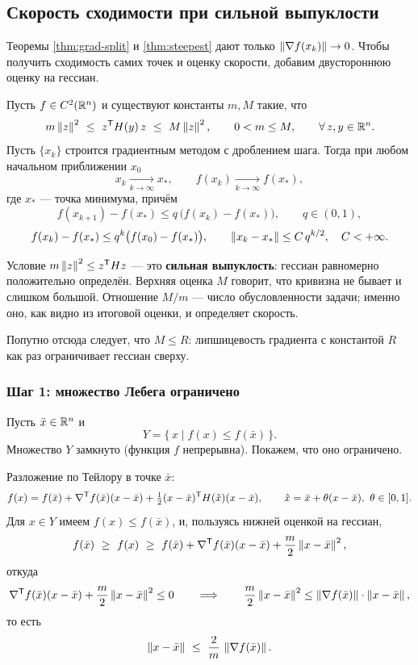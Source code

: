 \subsection{Скорость сходимости при сильной выпуклости}

Теоремы \ref{thm:grad-split} и \ref{thm:steepest} дают только
$\left\lVert \nabla f(x_k) \right\rVert \to 0$. Чтобы получить сходимость самих точек и оценку
скорости, добавим двустороннюю оценку на гессиан.

\begin{theorem}\label{thm:grad-rate}
Пусть $f \in C^2(\mathbb{R}^n)$ и существуют константы $m, M$ такие, что
\[
  m\left\lVert z \right\rVert^2 \ \le\ z^{\mathsf{T}} H(y)\, z \ \le\ M\left\lVert z \right\rVert^2 ,
  \qquad 0 < m \le M, \qquad \forall\, z, y \in \mathbb{R}^n .
\]
Пусть $\{x_k\}$ строится градиентным методом с дроблением шага. Тогда при
любом начальном приближении $x_0$
\[
  x_k \xrightarrow[k \to \infty]{} x_* , \qquad
  f(x_k) \xrightarrow[k \to \infty]{} f(x_*) ,
\]
где $x_*$ — точка минимума, причём
\[
  f(x_{k+1}) - f(x_*) \le q\,\big(f(x_k) - f(x_*)\big), \qquad q \in (0,1) ,
\]
\[
  f(x_k) - f(x_*) \le q^k\big(f(x_0) - f(x_*)\big) ,
  \qquad
  \left\lVert x_k - x_* \right\rVert \le C\, q^{k/2}, \quad C < +\infty .
\]
\end{theorem}

\begin{idea}
Условие $m\left\lVert z \right\rVert^2 \le z^{\mathsf{T}} H z$ — это \textbf{сильная выпуклость}: гессиан
равномерно положительно определён. Верхняя оценка $M$ говорит, что кривизна не
бывает и слишком большой. Отношение $M/m$ — число обусловленности задачи;
именно оно, как видно из итоговой оценки, и определяет скорость.

\medskip
Попутно отсюда следует, что $M \le R$: липшицевость градиента с константой
$R$ как раз ограничивает гессиан сверху.
\end{idea}

\subsubsection*{Шаг 1: множество Лебега ограничено}

Пусть $\bar x \in \mathbb{R}^n$ и
\[
  Y = \{\, x \mid f(x) \le f(\bar x) \,\} .
\]
Множество $Y$ замкнуто (функция $f$ непрерывна). Покажем, что оно ограничено.

Разложение по Тейлору в точке $\bar x$:
\[
  f(x) = f(\bar x) + \nabla^{\mathsf{T}} f(\bar x)(x - \bar x)
       + \tfrac12 (x-\bar x)^{\mathsf{T}} H(\hat x)(x - \bar x) ,
  \qquad \hat x = \bar x + \theta(x - \bar x), \ \theta \in [0,1] .
\]
Для $x \in Y$ имеем $f(x) \le f(\bar x)$, и, пользуясь нижней оценкой на
гессиан,
\[
  f(\bar x) \ \ge\ f(x)
  \ \ge\ f(\bar x) + \nabla^{\mathsf{T}} f(\bar x)(x-\bar x)
         + \frac{m}{2}\left\lVert x - \bar x \right\rVert^2 ,
\]
откуда
\[
  \nabla^{\mathsf{T}} f(\bar x)(x-\bar x) + \frac{m}{2}\left\lVert x-\bar x \right\rVert^2 \le 0
  \qquad\Longrightarrow\qquad
  \frac{m}{2}\left\lVert x-\bar x \right\rVert^2 \le \left\lVert \nabla f(\bar x) \right\rVert\cdot\left\lVert x-\bar x \right\rVert ,
\]
то есть
\[
  \norm{x - \bar x} \ \le\ \frac{2}{m}\,\norm{\nabla f(\bar x)} .
\]

